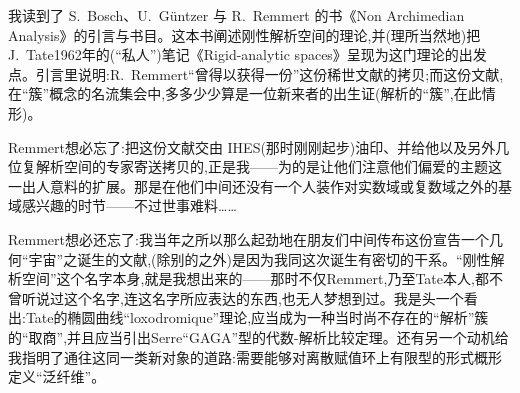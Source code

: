 \noindent 我读到了 S.~Bosch、U.~Güntzer 与 R.~Remmert 的书《Non Archimedian Analysis》的引言与书目。这本书阐述刚性解析空间的理论,并(理所当然地)把 J.~Tate1962年的(“私人”)笔记《Rigid-analytic spaces》呈现为这门理论的出发点。引言里说明:R.~Remmert“曾得以获得一份”这份稀世文献的拷贝;而这份文献,在\dmark{}“簇”概念的名流集会中,多多少少算是一位新来者的出生证(解析的“簇”,在此情形)。

\noindent {}Remmert想必忘了:把这份文献交由 IHES(那时刚刚起步)油印、并给他以及另外几位复解析空间的专家寄送拷贝的,正是我——为的是让他们注意他们偏爱的主题这一出人意料的扩展。那是在他们中间还没有一个人装作对实数域或复数域之外的基域感兴趣的时节——不过世事难料……

\noindent Remmert想必还忘了:我当年之所以那么起劲地在朋友们中间传布这份宣告一个几何“宇宙”之诞生的文献,(除别的之外)是因为我同这次诞生有密切的干系。“刚性解析空间”这个名字本身,就是我想出来的——那时不仅Remmert,乃至Tate本人,都不曾听说过这个名字,连这名字所应表达的东西,也无人梦想到过。我是头一个看出:Tate的椭圆曲线“loxodromique”理论,应当成为一种当时尚不存在的“解析”簇的“取商”,并且应当引出Serre“GAGA”型的代数-解析比较定理。还有另一个动机给我指明了通往这同一类新对象的道路:需要能够对离散赋值环上有限型的形式概形定义“泛纤维”。
